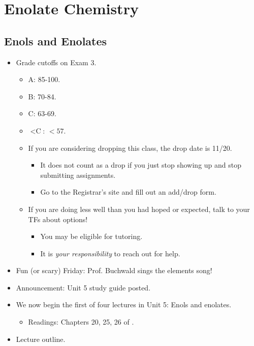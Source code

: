 \documentclass[../notes.tex]{subfiles}
\begin{document}
\chapter{Enolate Chemistry}
\setcounter{section}{28}
\section{Enols and Enolates}
\begin{itemize}
    \item {}Grade cutoffs on Exam 3.
    \begin{itemize}
        \item A: 85-100.
        \item B: 70-84.
        \item C: 63-69.
        \item $<\text{C}$: $<57$.
        \item If you are considering dropping this class, the drop date is 11/20.
        \begin{itemize}
            \item It does not count as a drop if you just stop showing up and stop submitting assignments.
            \item Go to the Registrar's site and fill out an add/drop form.
        \end{itemize}
        \item If you are doing less well than you had hoped or expected, talk to your TFs about options!
        \begin{itemize}
            \item You may be eligible for tutoring.
            \item It is \emph{your responsibility} to reach out for help.
        \end{itemize}
    \end{itemize}
    \item Fun (or scary) Friday: Prof. Buchwald sings the elements song!
    \item Announcement: Unit 5 study guide posted.
    \item We now begin the first of four lectures in Unit 5: Enols and enolates.
    \begin{itemize}
        \item Readings: Chapters 20, 25, 26 of \textcite{bib:Clayden}.
    \end{itemize}
    \item Lecture outline.
    \begin{enumerate}[label={\Alph*.}]

\end{enumerate}
\end{itemize}
\end{document}
